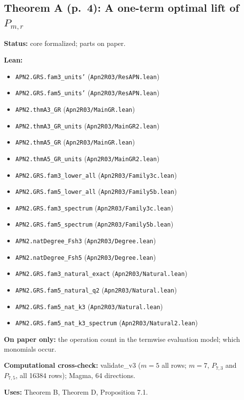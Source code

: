 \documentclass[11pt]{article}
\begin{document}
\subsection*{Theorem A (p.~4): A one-term optimal lift of $P_{m,r}$}
\textbf{Status:} core formalized; parts on paper.\par
\textbf{Lean:}\begin{itemize}\setlength\itemsep{0pt}
\item \texttt{APN2.GRS.fam3\_units'} \hfill (\texttt{Apn2R03/ResAPN.lean})
\item \texttt{APN2.GRS.fam5\_units'} \hfill (\texttt{Apn2R03/ResAPN.lean})
\item \texttt{APN2.thmA3\_GR} \hfill (\texttt{Apn2R03/MainGR.lean})
\item \texttt{APN2.thmA3\_GR\_units} \hfill (\texttt{Apn2R03/MainGR2.lean})
\item \texttt{APN2.thmA5\_GR} \hfill (\texttt{Apn2R03/MainGR.lean})
\item \texttt{APN2.thmA5\_GR\_units} \hfill (\texttt{Apn2R03/MainGR2.lean})
\item \texttt{APN2.GRS.fam3\_lower\_all} \hfill (\texttt{Apn2R03/Family3c.lean})
\item \texttt{APN2.GRS.fam5\_lower\_all} \hfill (\texttt{Apn2R03/Family5b.lean})
\item \texttt{APN2.GRS.fam3\_spectrum} \hfill (\texttt{Apn2R03/Family3c.lean})
\item \texttt{APN2.GRS.fam5\_spectrum} \hfill (\texttt{Apn2R03/Family5b.lean})
\item \texttt{APN2.natDegree\_Fsh3} \hfill (\texttt{Apn2R03/Degree.lean})
\item \texttt{APN2.natDegree\_Fsh5} \hfill (\texttt{Apn2R03/Degree.lean})
\item \texttt{APN2.GRS.fam3\_natural\_exact} \hfill (\texttt{Apn2R03/Natural.lean})
\item \texttt{APN2.GRS.fam5\_natural\_q2} \hfill (\texttt{Apn2R03/Natural.lean})
\item \texttt{APN2.GRS.fam5\_nat\_k3} \hfill (\texttt{Apn2R03/Natural.lean})
\item \texttt{APN2.GRS.fam5\_nat\_k3\_spectrum} \hfill (\texttt{Apn2R03/Natural2.lean})
\end{itemize}
\textbf{On paper only:} the operation count in the termwise evaluation model; which monomials occur.\par
\textbf{Computational cross-check:} validate\_v3 ($m=5$ all rows; $m=7$, $P_{7,3}$ and $P_{7,5}$, all 16384 rows); Magma, 64 directions.\par
\textbf{Uses:} Theorem B, Theorem D, Proposition 7.1.\par
\end{document}
